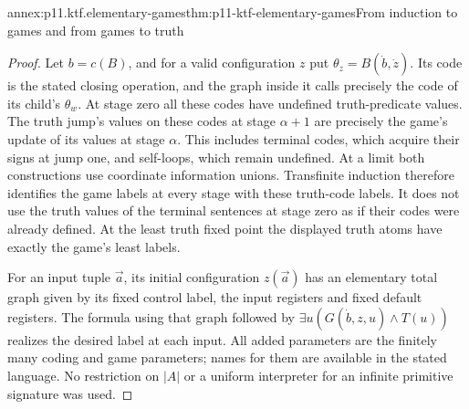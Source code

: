 \begin{annexitem}{annex:p11.ktf.elementary-games}{thm:p11-ktf-elementary-games}{From induction to games and from games to truth}
\begin{proof}
Let \(b=c(B)\), and for a valid configuration \(z\) put
\(\theta_z=B(\dot b,\dot z)\). Its code is the stated
closing operation, and the graph inside it calls precisely
the code of its child's \(\theta_w\). At stage zero all
these codes have undefined truth-predicate values. The truth jump's
values on these codes at stage \(\alpha+1\) are precisely
the game's update of its values at stage \(\alpha\).
This includes terminal codes, which acquire their signs at jump
one, and self-loops, which remain undefined. At a limit both
constructions use coordinate information unions. Transfinite induction
therefore identifies the game labels at every stage with these
truth-code labels. It does not use the truth values of the terminal
sentences at stage zero as if their codes were already defined.
At the least truth fixed point the displayed truth atoms have
exactly the game's least labels.

For an input tuple \(\vec a\), its initial configuration
\(z(\vec a)\) has an elementary total graph given by its
fixed control label, the input registers and fixed default registers.
The formula using that graph followed by
\(\exists u(G(\dot b,z,u)\land T(u))\) realizes the
desired label at each input. All added parameters are the finitely
many coding and game parameters; names for them are available
in the stated language. No restriction on \(|A|\) or a
uniform interpreter for an infinite primitive signature was used.
\end{proof}
\end{annexitem}

